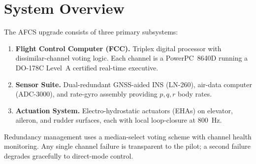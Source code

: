 \section{System Overview}
The AFCS upgrade consists of three primary subsystems:

\begin{enumerate}[label=\textbf{\arabic*.}, leftmargin=*]
  \item \textbf{Flight Control Computer (FCC).} Triplex digital processor with
        dissimilar-channel voting logic. Each channel is a PowerPC~8640D running
        a DO-178C Level~A certified real-time executive.
  \item \textbf{Sensor Suite.} Dual-redundant GNSS-aided INS (LN-260), air-data
        computer (ADC-3000), and rate-gyro assembly providing $p,q,r$ body rates.
  \item \textbf{Actuation System.} Electro-hydrostatic actuators (EHAs) on elevator,
        aileron, and rudder surfaces, each with local loop-closure at 800~Hz.
\end{enumerate}

Redundancy management uses a median-select voting scheme with channel health
monitoring. Any single channel failure is transparent to the pilot; a second
failure degrades gracefully to direct-mode control.
